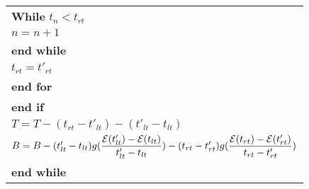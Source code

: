 \begin{table}
\begin{minipage}[b]{8cm}
\begin{tabular}{p{7cm}}
\hspace{10mm}\textbf{While} $t_n < t_{rt}$
\\
\hspace{13mm} $n=n+1$
\\
\hspace{10mm} \textbf{end while}
\\
\hspace{7mm} $t_{rt} = t'_{rt}$
\\
\hspace{7mm}\textbf{end for}
\\
\hspace{4mm}\textbf{end if}
\\
\hspace{4mm} $T = T - (t_{rt}-t'_{lt}) - (t'_{lt} - t_{lt})$
\\
\hspace{4mm}$B = B -  (t'_{lt}-t_{lt})g(\dfrac{\mathcal{E}(t'_{lt})-\mathcal{E}(t_{lt})}{t'_{lt}-t_{lt}}) - (t_{rt}-t'_{rt})g(\dfrac{\mathcal{E}(t_{rt})-\mathcal{E}(t'_{rt})}{t_{rt}-t'_{rt}})$
\\
\textbf{end while}
\end{tabular}
\end{minipage}
\end{table}

